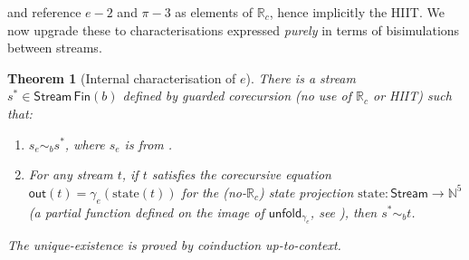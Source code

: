 \documentclass[12pt]{article}
\newtheorem{theorem}{Theorem}[section]
\theoremstyle{definition}
\theoremstyle{remark}
\newcommand{\N}{\mathbb{N}}
\newcommand{\R}{\mathbb{R}}
\newcommand{\Rc}{\R_c}
\newcommand{\Stream}{\mathsf{Stream}}
\newcommand{\out}{\mathsf{out}}
\newcommand{\unfold}{\mathsf{unfold}}
\newcommand{\bisim}{\mathrel{\sim}}
\begin{document}
 and  reference $e-2$ and
$\pi - 3$ as elements of $\Rc$, hence implicitly the HIIT\@.
We now upgrade these to characterisations expressed
\emph{purely} in terms of bisimulations between streams.

\begin{theorem}[Internal characterisation of $e$]\label{thm:e-internal}
There is a stream $s^* \in \Stream\,\mathsf{Fin}(b)$ defined by
guarded corecursion (no use of $\Rc$ or HIIT) such that:
\begin{enumerate}
\item $s_e \bisim_b s^*$, where $s_e$ is from .
\item For any stream $t$, if $t$ satisfies the corecursive equation
$\out(t) = \gamma_e(\mathrm{state}(t))$ for the (no-$\Rc$) state
projection $\mathrm{state}: \Stream \to \N^5$ (a partial function
defined on the image of $\unfold_{\gamma_e}$, see ),
then $s^* \bisim_b t$.
\end{enumerate}
The unique-existence is proved by coinduction up-to-context.
\end{theorem}
\end{document}
